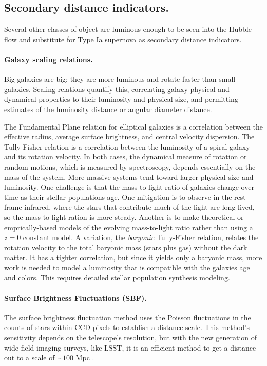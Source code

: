 \subsection{Secondary distance indicators.}

Several other classes of object are luminous enough to be seen into the Hubble flow and substitute for Type Ia supernova as secondary distance indicators.


\paragraph{Galaxy scaling relations.}  Big galaxies are big: they are more luminous and rotate faster than small galaxies.  Scaling relations quantify this, correlating galaxy physical and dynamical properties to their luminosity and physical size, and permitting estimates of the luminosity distance or angular diameter distance.  

The Fundamental Plane relation for elliptical galaxies is a correlation between the effective radius, average surface brightness, and central velocity dispersion.  The Tully-Fisher relation is a correlation between the luminosity of a spiral galaxy and its rotation velocity.  In both cases, the dynamical measure of rotation or random motions, which is measured by spectroscopy, depends essentially on the mass of the system.  More massive systems tend toward larger physical size and luminosity.  One challenge is that the mass-to-light ratio of galaxies change over time as their stellar populations age.  One mitigation is to observe in the rest-frame infrared, where the stars that contribute much of the light are long lived, so the mass-to-light ration is more steady.  Another is to make theoretical or emprically-based models of the evolving mass-to-light ratio rather than using a $z=0$ constant model.  A variation, the \textit{baryonic} Tully-Fisher relation, relates the rotation velocity to the total baryonic mass (stars plus gas) without the dark matter.  It has a tighter correlation, but since it yields only a baryonic mass, more work is needed to model a luminosity that is compatible with the galaxies age and colors.  This requires detailed stellar population synthesis modeling.  

\paragraph{Surface Brightness Fluctuations (SBF).}  The surface brightness fluctuation method uses the Poisson fluctuations in the counts of stars within CCD pixels to establish a distance scale.  This method's sensitivity depends on the telescope's resolution, but with the new generation of wide-field imaging surveys, like LSST, it is an efficient method to get a distance out to a scale of $\sim 100$ Mpc \citep{2025A&A...704A..99R}.


